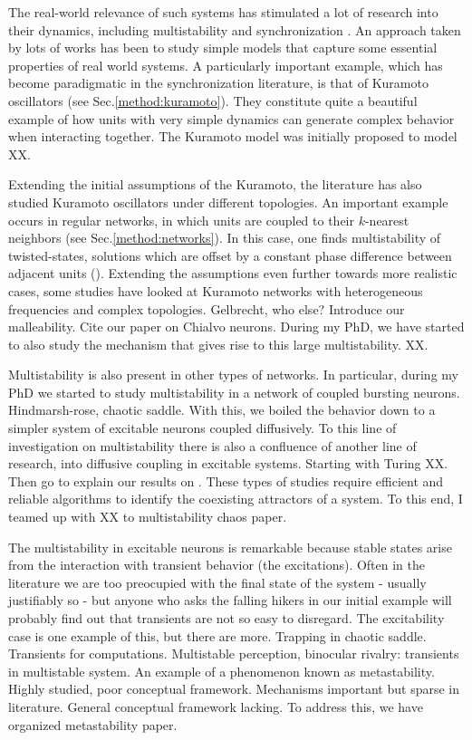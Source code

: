 The real-world relevance of such systems has stimulated a lot of research into their dynamics, including multistability and synchronization \cite{}. An approach taken by lots of works has been to study simple models that capture some essential properties of real world systems. A particularly important example, which has become paradigmatic in the synchronization literature, is that of Kuramoto oscillators (see Sec.\ref{method:kuramoto}). They constitute quite a beautiful example of how units with very simple dynamics can generate complex behavior when interacting together. The Kuramoto model was initially proposed to model XX.

Extending the initial assumptions of the Kuramoto, the literature has also studied Kuramoto oscillators under different topologies. An important example occurs in regular networks, in which units are coupled to their $k$-nearest neighbors (see Sec.\ref{method:networks}). In this case, one finds multistability of twisted-states, solutions which are offset by a constant phase difference between adjacent units (). Extending the assumptions even further towards more realistic cases, some studies have looked at Kuramoto networks with heterogeneous frequencies and complex topologies. Gelbrecht, who else? Introduce our malleability. Cite our paper on Chialvo neurons.
During my PhD, we have started to also study the mechanism that gives rise to this large multistability. XX.


Multistability is also present in other types of networks. In particular, during my PhD we started to study multistability in a network of coupled bursting neurons. Hindmarsh-rose, chaotic saddle. With this, we boiled the behavior down to a simpler system of excitable neurons coupled diffusively. To this line of investigation on multistability there is also a confluence of another line of research, into diffusive coupling in excitable systems. Starting with Turing XX. Then go to explain our results on . These types of studies require efficient and reliable algorithms to  identify the coexisting attractors of a system. To this end, I teamed up with XX to multistability chaos paper.


The multistability in excitable neurons is remarkable because stable states arise from the interaction with transient behavior (the excitations). Often in the literature we are too preocupied with the final state of the system - usually justifiably so - but anyone who asks the falling hikers in our initial example will probably find out that transients are not so easy to disregard. The excitability case is one example of this, but there are more. Trapping in chaotic saddle. Transients for computations. Multistable perception, binocular rivalry: transients in multistable system. An example of a phenomenon known as metastability. Highly studied, poor conceptual framework. Mechanisms important but sparse in literature. General conceptual framework lacking. To address this, we have organized metastability paper. 




